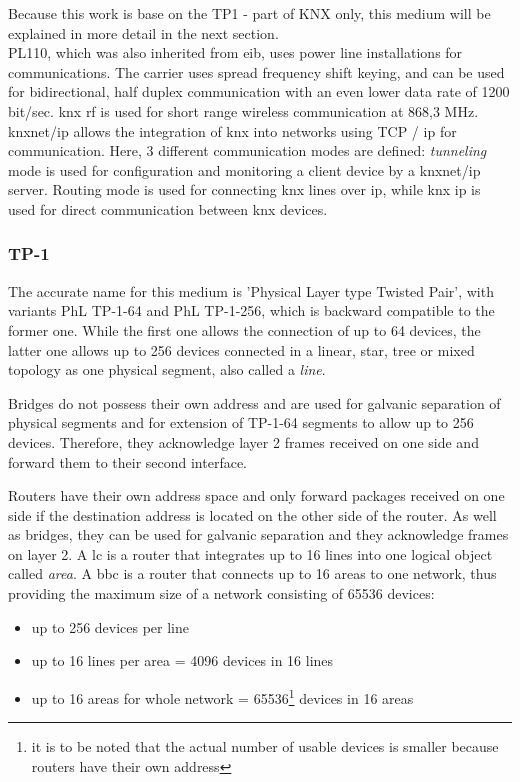 Because this work is base on the \gls{TP}1 - part of KNX only, this medium will be explained in more detail in the next section.
\\

PL110, which was also inherited from \gls{eib}, uses power line installations for communications. The carrier uses spread frequency shift keying, and can be used 
for bidirectional, half duplex  communication with an even lower data rate of 1200 bit/sec. \gls{knx} \gls{rf} is used for short range wireless communication
at 868,3 MHz. \gls{knx}net/\gls{ip} allows the integration of \gls{knx} into networks using \gls{TCP} / \gls{ip} for communication. Here, 3 different communication
modes are defined: \textit{tunneling} mode is used for configuration and monitoring a client device by a \gls{knx}net/\gls{ip} server. Routing mode is used
for connecting \gls{knx} lines over \gls{ip}, while \gls{knx} \gls{ip} is used for direct communication between \gls{knx} devices. \cite{KraInnosec2013}

\subsubsection{TP-1}

The accurate name for this medium is 'Physical Layer type Twisted Pair', with variants
PhL \gls{TP}-1-64 and PhL \gls{TP}-1-256, which is backward compatible to the former one. While the first one allows
the connection of up to 64 devices, the latter one allows up to 256 devices connected in a linear, star, tree or
mixed topology as one physical segment, also called a \textit{line}.

Bridges do not possess their own address and are used for galvanic separation of physical segments and for extension of TP-1-64 segments to allow up to 256 devices.
Therefore, they acknowledge layer 2 frames received on one side and forward them to their second interface. 

Routers have their own address space and only forward packages received on one side if the destination address is located on the other side of the router.
As well as bridges, they can be used for galvanic separation and they acknowledge frames on layer 2.
A \gls{lc} is a router that integrates up to 16 lines into one logical object called \textit{area}. A \gls{bbc} is a router that connects
up to 16 areas to one network, thus providing the maximum size of a network consisting of 65536 devices:

\begin{itemize}
 \item up to 256 devices per line
 \item up to 16 lines per area = 4096 devices in 16 lines
 \item up to 16 areas for whole network = 65536\footnote{it is to be noted that the actual number of usable devices is smaller because routers have
 their own address} devices in 16 areas
\end{itemize}

